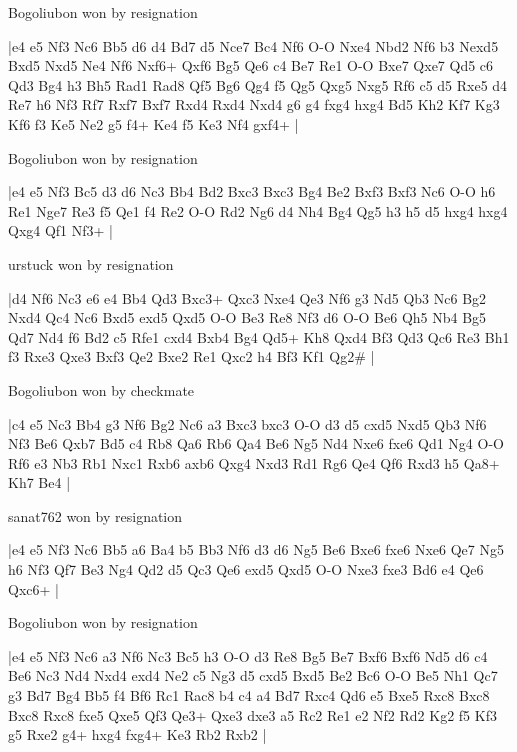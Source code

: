 Bogoliubon won by resignation

\makegametitle
|e4 e5 Nf3 Nc6 Bb5 d6 d4 Bd7 d5 Nce7 Bc4 Nf6 O-O Nxe4 Nbd2 Nf6 b3 Nexd5 Bxd5 Nxd5 Ne4 Nf6 Nxf6+ Qxf6 Bg5 Qe6 c4 Be7 Re1 O-O Bxe7 Qxe7 Qd5 c6 Qd3 Bg4 h3 Bh5 Rad1 Rad8 Qf5 Bg6 Qg4 f5 Qg5 Qxg5 Nxg5 Rf6 c5 d5 Rxe5 d4 Re7 h6 Nf3 Rf7 Rxf7 Bxf7 Rxd4 Rxd4 Nxd4 g6 g4 fxg4 hxg4 Bd5 Kh2 Kf7 Kg3 Kf6 f3 Ke5 Ne2 g5 f4+ Ke4 f5 Ke3 Nf4 gxf4+  |

\showboard

Bogoliubon won by resignation

\makegametitle
|e4 e5 Nf3 Bc5 d3 d6 Nc3 Bb4 Bd2 Bxc3 Bxc3 Bg4 Be2 Bxf3 Bxf3 Nc6 O-O h6 Re1 Nge7 Re3 f5 Qe1 f4 Re2 O-O Rd2 Ng6 d4 Nh4 Bg4 Qg5 h3 h5 d5 hxg4 hxg4 Qxg4 Qf1 Nf3+  |

\showboard

urstuck won by resignation

\makegametitle
|d4 Nf6 Nc3 e6 e4 Bb4 Qd3 Bxc3+ Qxc3 Nxe4 Qe3 Nf6 g3 Nd5 Qb3 Nc6 Bg2 Nxd4 Qc4 Nc6 Bxd5 exd5 Qxd5 O-O Be3 Re8 Nf3 d6 O-O Be6 Qh5 Nb4 Bg5 Qd7 Nd4 f6 Bd2 c5 Rfe1 cxd4 Bxb4 Bg4 Qd5+ Kh8 Qxd4 Bf3 Qd3 Qc6 Re3 Bh1 f3 Rxe3 Qxe3 Bxf3 Qe2 Bxe2 Re1 Qxc2 h4 Bf3 Kf1 Qg2\#  |

\showboard

Bogoliubon won by checkmate

\makegametitle
|c4 e5 Nc3 Bb4 g3 Nf6 Bg2 Nc6 a3 Bxc3 bxc3 O-O d3 d5 cxd5 Nxd5 Qb3 Nf6 Nf3 Be6 Qxb7 Bd5 c4 Rb8 Qa6 Rb6 Qa4 Be6 Ng5 Nd4 Nxe6 fxe6 Qd1 Ng4 O-O Rf6 e3 Nb3 Rb1 Nxc1 Rxb6 axb6 Qxg4 Nxd3 Rd1 Rg6 Qe4 Qf6 Rxd3 h5 Qa8+ Kh7 Be4  |

\showboard

sanat762 won by resignation

\makegametitle
|e4 e5 Nf3 Nc6 Bb5 a6 Ba4 b5 Bb3 Nf6 d3 d6 Ng5 Be6 Bxe6 fxe6 Nxe6 Qe7 Ng5 h6 Nf3 Qf7 Be3 Ng4 Qd2 d5 Qc3 Qe6 exd5 Qxd5 O-O Nxe3 fxe3 Bd6 e4 Qe6 Qxc6+  |

\showboard

Bogoliubon won by resignation

\makegametitle
|e4 e5 Nf3 Nc6 a3 Nf6 Nc3 Bc5 h3 O-O d3 Re8 Bg5 Be7 Bxf6 Bxf6 Nd5 d6 c4 Be6 Nc3 Nd4 Nxd4 exd4 Ne2 c5 Ng3 d5 cxd5 Bxd5 Be2 Bc6 O-O Be5 Nh1 Qc7 g3 Bd7 Bg4 Bb5 f4 Bf6 Rc1 Rac8 b4 c4 a4 Bd7 Rxc4 Qd6 e5 Bxe5 Rxc8 Bxc8 Bxc8 Rxc8 fxe5 Qxe5 Qf3 Qe3+ Qxe3 dxe3 a5 Rc2 Re1 e2 Nf2 Rd2 Kg2 f5 Kf3 g5 Rxe2 g4+ hxg4 fxg4+ Ke3 Rb2 Rxb2  |

